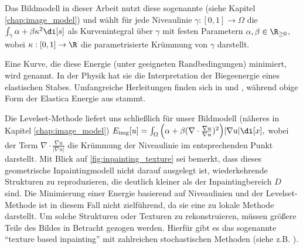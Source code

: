 \documentclass{mythesis}
\begin{document}
Das Bildmodell in dieser Arbeit nutzt diese sogenannte  (siehe Kapitel \ref{chap:image_model}) und wählt für jede Niveaulinie $\gamma:[0,1] \to \Omega$ die 
\begin{math}
    \int_{\gamma} \alpha + \beta \kappa^2 \di[s]
\end{math}
als Kurvenintegral über $\gamma$ mit festen Parametern $\alpha, \beta \in \R_{\ge 0}$, wobei $\kappa: [0,1] \to \R$ die parametrisierte Krümmung von $\gamma$ darstellt.

Eine Kurve, die diese Energie (unter geeigneten Randbedingungen) minimiert, wird  genannt.
In der Physik hat sie die Interpretation der Biegeenergie eines elastischen Stabes.
Umfangreiche Herleitungen finden sich in \cite{love1920treatise} und \cite{antman2005problems}, während obige Form der Elastica Energie aus \cite{birkhoff1965nonlinear} stammt.

Die Levelset-Methode liefert uns schließlich für unser Bildmodell (näheres in Kapitel \ref{chap:image_model})
\begin{math}
    \Eimg[u] = \int_{\Omega} \Big(\alpha + \beta (\nabla \cdot \frac{\nabla u}{\nabla u})^2\Big)|\nabla u| \di[x],
\end{math}
wobei der Term $\nabla \cdot \frac{\nabla u}{|\nabla u|}$ die Krümmung der Niveaulinie im entsprechenden Punkt darstellt.
Mit Blick auf \ref{fig:inpainting_texture} sei bemerkt, dass dieses geometrische Inpaintingmodell nicht darauf ausgelegt ist, wiederkehrende Strukturen zu reproduzieren, die deutlich kleiner als der Inpaintingbereich $D$ sind.
Die Minimierung einer Energie basierend auf Niveaulinien und der Levelset-Methode ist in diesem Fall nicht zielführend, da sie eine zu lokale Methode darstellt.
Um solche Strukturen oder Texturen zu rekonstruieren, müssen größere Teile des Bildes in Betracht gezogen werden.
Hierfür gibt es das sogenannte “texture based inpainting” mit zahlreichen stochastischen Methoden (siehe z.B. \cite{criminisi2004region}).
\end{document}
